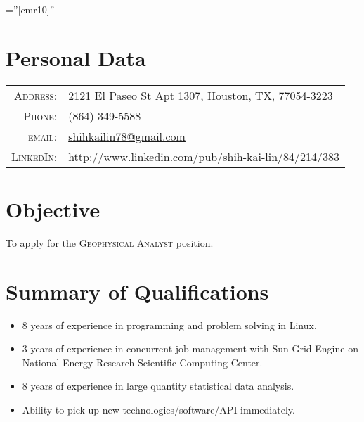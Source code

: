 \documentclass[11pt]{article} %
\begin{document}
\pagestyle{empty} %

\font\fb=''[cmr10]'' %


\par{\bigskip\par} %

\section{Personal Data}

\begin{tabular}{rl}
\textsc{Address:} & 2121 El Paseo St Apt 1307, Houston, TX, 77054-3223 \\
\textsc{Phone:} & (864) 349-5588 \\
\textsc{email:} & \href{mailto:shihkailin78@gmail.com}{shihkailin78@gmail.com} \\
\textsc{LinkedIn:} & \href{http://www.linkedin.com/pub/shih-kai-lin/84/214/383}{http://www.linkedin.com/pub/shih-kai-lin/84/214/383}
\end{tabular}


\section{Objective}
To apply for the \textsc{Geophysical Analyst} position.



\section{Summary of Qualifications}
\begin{itemize}
  \item 8 years of experience in programming and problem solving in Linux.
  \item 3 years of experience in concurrent job management with Sun Grid Engine on National Energy Research Scientific Computing Center.
  \item 8 years of experience in large quantity statistical data analysis.
  \item Ability to pick up new technologies/software/API immediately.
\end{itemize}
\end{document}
